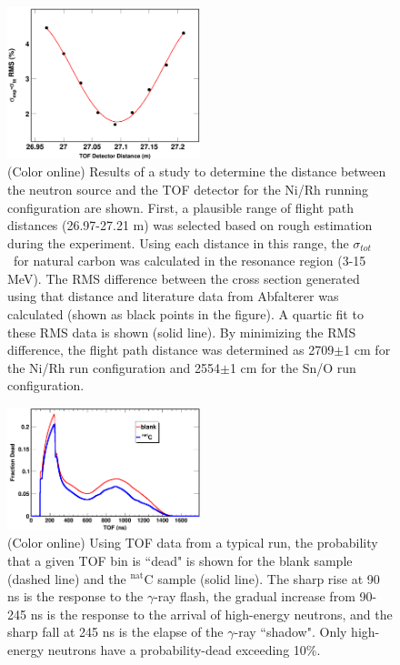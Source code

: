 \documentclass[twocolumn,secnumarabic,amssymb, nobibnotes, aps, prl,
superscriptaddress, nobalancelastpage]{revtex4}
\newcommand{\tot}{\ensuremath{\sigma_{tot}}}
\begin{document}
\begin{figure}
    \includegraphics[width=0.5\textwidth]{figures/DistanceStudyNi.png}
    \caption{(Color online) Results of a study to determine the distance between
    the neutron source and the TOF detector for the Ni/Rh running configuration
are shown. First, a plausible range of flight path distances (26.97-27.21 m) was
selected based on rough estimation during the experiment. Using each
distance in this range, the \tot\ for natural carbon was calculated in the
resonance region (3-15 MeV). The RMS difference between the cross section
generated using that distance and literature data from Abfalterer
\cite{Abfalterer2000, Abfalterer2001} was calculated (shown as black points in
the figure). A quartic fit to these RMS data is shown (solid line). By minimizing the
RMS difference, the flight path distance was determined as 2709$\pm$1 cm for the
Ni/Rh run configuration and 2554$\pm$1 cm for the Sn/O run configuration.}
    \label{DistanceStudy}
\end{figure}

\begin{figure}
    \includegraphics[width=0.5\textwidth]{figures/exampleDeadtimeSpectrum.png}
    \caption{(Color online) Using TOF data from a typical run, the probability that a given 
        TOF bin is ``dead" is shown for the blank sample (dashed line) and the $^{\text{nat}}$C   
        sample (solid line). The sharp rise at 90 ns is the response to the
        $\gamma$-ray flash, the gradual increase from 90-245 ns is the response to
        the arrival of high-energy neutrons, and the sharp fall at 245 ns
        is the elapse of the $\gamma$-ray ``shadow". Only high-energy neutrons
        have a probability-dead exceeding 10\%.
    }
    \label{ExampleDeadtimeSpectrum}
\end{figure}
\end{document}
